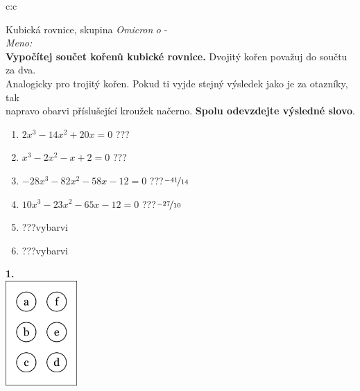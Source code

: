 \documentclass[10pt]{report}
\newcommand\omicron{o}
\begin{document}
\begin{tabular}{c:c}
\begin{minipage}[c][99mm][t]{0.49\linewidth}
\begin{center}
\vspace{7mm}
{\huge Kubická rovnice, skupina \textit{Omicron $\omicron$} -}\\[4.5mm]
\textit{Meno:}\phantom{xxxxxxxxxxxxxxxxxxxxxxxxxxxxxxxxxxxxxxxxxxxxxxxxxxxxxxxxxxxxxxxxx}\\[3.5mm]
\textbf{Vypočítej součet kořenů kubické rovnice.} Dvojitý kořen považuj do součtu za dva.\\Analogicky pro trojitý kořen. Pokud ti vyjde stejný výsledek jako je za otazníky, tak\\napravo obarvi příslušející kroužek načerno. \textbf{Spolu odevzdejte výsledné slovo}.\\[3mm]
\begin{minipage}{0.77\linewidth}
\begin{center}
\begin{varwidth}{\textwidth}
\begin{enumerate}
\large
\item $2x^3-14x^2+20x=0$\quad \dotfill\; ???\;\dotfill {}
\item $x^3-2x^2-x+2=0$\quad \dotfill\; ???\;\dotfill {}
\item $-28x^3-82x^2-58x-12=0$\quad \dotfill\; ???\;\dotfill \quad $\nicefrac{-41}{14}$
\item $10x^3-23x^2-65x-12=0$\quad \dotfill\; ???\;\dotfill \quad $\nicefrac{-27}{10}$
\item \quad \dotfill\; ???\;\dotfill \quad vybarvi
\item \quad \dotfill\; ???\;\dotfill \quad vybarvi
\end{enumerate}
\end{varwidth}
\end{center}
\end{minipage}
\begin{minipage}{0.20\linewidth}
\begin{center}
{\Huge\bfseries 1.} \\[2mm]
\includegraphics[height=40mm]{../images/braille.png}

\end{center}
\end{minipage}
\end{center}
\end{minipage}
\end{tabular}
\end{document}
